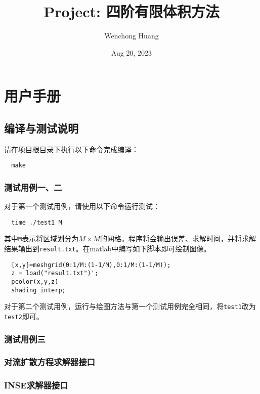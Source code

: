 \documentclass[lang=cn,10pt]{elegantbook}
\title{Project: 四阶有限体积方法}
\author{Wenchong Huang}
\date{Aug 20, 2023}
\begin{document}
\maketitle
\frontmatter

\tableofcontents

\mainmatter

\chapter{用户手册}

\section{编译与测试说明}

请在项目根目录下执行以下命令完成编译：
\begin{lstlisting}
  make
\end{lstlisting}

\subsection{测试用例一、二}

对于第一个测试用例，请使用以下命令运行测试：
\begin{lstlisting}
  time ./test1 M
\end{lstlisting}

其中\verb|M|表示将区域划分为$M\times M$的网格。程序将会输出误差、求解时间，并将求解结果输出到\verb|result.txt|。在matlab中编写如下脚本即可绘制图像。
\begin{lstlisting}
  [x,y]=meshgrid(0:1/M:(1-1/M),0:1/M:(1-1/M));
  z = load("result.txt")';
  pcolor(x,y,z)
  shading interp;
\end{lstlisting}

对于第二个测试用例，运行与绘图方法与第一个测试用例完全相同，将\verb|test1|改为\verb|test2|即可。

\subsection{测试用例三}

\subsection{对流扩散方程求解器接口}

\subsection{INSE求解器接口}
\end{document}
